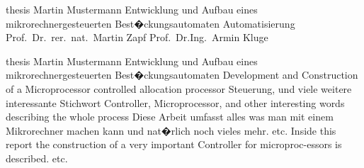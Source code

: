 
  




													{thesis}																			%
													{Martin Mustermann}														%
													{Entwicklung und Aufbau eines 
													 mikrorechnergesteuerten 
													 Best�ckungsautomaten}											  %
													{Automatisierung}						%
													{Prof.\ Dr.\ rer.\ nat.\ Martin Zapf}					%
													{Prof.\ Dr.\-Ing.\ Armin Kluge}								%
													

													{thesis}																			%
													{Martin Mustermann}														%
													{Entwicklung und Aufbau eines 
													 mikrorechnergesteuerten 
													 Best�ckungsautomaten}											  %
													{Development and Construction of a Microprocessor 
													controlled allocation processor}							%
													{Steuerung, und viele weitere interessante 
													Stichwort}																		%
													{Controller, Microprocessor, and other 
													interesting words describing the whole 
													process}																			%
													{Diese Arbeit umfasst alles was man mit einem 
													Mikrorechner machen kann und nat�rlich noch vieles mehr.
													etc.}																					%
													{Inside this report the construction of a very 
													important Controller for microproc-essors is 
													described.												
													etc.}																			%

